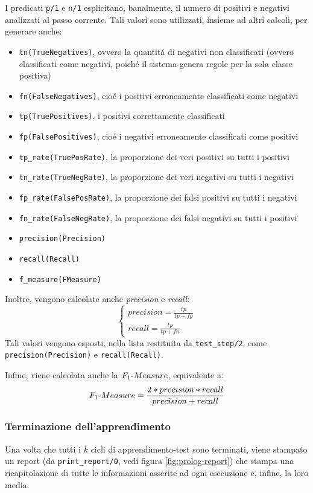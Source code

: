 \documentclass[preprint]{acm_proc_article-sp}
\begin{document}
I predicati \verb|p/1| e \verb|n/1| esplicitano, banalmente, il numero di positivi e negativi analizzati al passo corrente. Tali valori sono utilizzati, insieme ad altri calcoli, per generare anche:
\begin{itemize}
\item \verb|tn(TrueNegatives)|, ovvero la quantit\'a di negativi non classificati (ovvero classificati come negativi, poich\'e il sistema genera regole per la sola classe positiva)
\item \verb|fn(FalseNegatives)|, cio\'e i positivi erroneamente classificati come negativi
\item \verb|tp(TruePositives)|, i positivi correttamente classificati
\item \verb|fp(FalsePositives)|, cio\'e i negativi erroneamente classificati come positivi
\item \verb|tp_rate(TruePosRate)|, la proporzione dei veri positivi su tutti i positivi
\item \verb|tn_rate(TrueNegRate)|, la proporzione dei veri negativi su tutti i negativi
\item \verb|fp_rate(FalsePosRate)|, la proporzione dei falsi positivi su tutti i negativi
\item \verb|fn_rate(FalseNegRate)|, la proporzione dei falsi negativi su tutti i positivi
\item \verb|precision(Precision)|
\item \verb|recall(Recall)|
\item \verb|f_measure(FMeasure)|
\end{itemize}

Inoltre, vengono calcolate anche \textit{precision} e \textit{recall}:
\[
\begin{cases}
precision = \frac{tp}{tp+fp} \\
recall = \frac{tp}{tp+fn}
\end{cases}
\]
Tali valori vengono esposti, nella lista restituita da \verb|test_step/2|, come \verb|precision(Precision)| e \verb|recall(Recall)|.

Infine, viene calcolata anche la $F_1\textnormal{-}Measure$, equivalente a:
\[ F_1\textnormal{-}Measure = \frac{2*precision*recall}{precision+recall} \]

\subsubsection{Terminazione dell'apprendimento}
Una volta che tutti i $k$ cicli di apprendimento-test sono terminati, viene stampato un report (da \verb|print_report/0|, vedi figura \ref{fig:prolog-report}) che stampa una ricapitolazione di tutte le informazioni asserite ad ogni esecuzione e, infine, la loro media.
\end{document}
